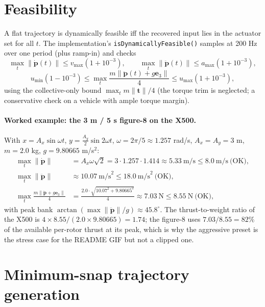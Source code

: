 \documentclass[11pt]{article}
\begin{document}
\section{Feasibility}
\label{sec:feas}

A flat trajectory is dynamically feasible iff the recovered input lies in the actuator set
for all $t$. The implementation's \texttt{isDynamicallyFeasible()} samples at 200 Hz over
one period (plus ramp-in) and checks
\begin{equation}
  \max_t \| \dot{\bm p}(t) \| \le v_{\max} (1 + 10^{-3}),
  \qquad
  \max_t \| \ddot{\bm p}(t) \| \le a_{\max} (1 + 10^{-3}),
  \label{eq:feas}
\end{equation}
\begin{equation}
  u_{\min}(1 - 10^{-3}) \le \max_t \frac{m \|\ddot{\bm p}(t) + g \bm e_3\|}{4}
  \le u_{\max}(1 + 10^{-3}),
  \label{eq:feas2}
\end{equation}
using the collective-only bound $\max_t m\|\bm t\|/4$ (the torque trim is neglected; a
conservative check on a vehicle with ample torque margin).

\paragraph{Worked example: the 3 m / 5 s figure-8 on the X500.} With
$x = A_x \sin \omega t$, $y = \frac{A_y}{2}\sin 2\omega t$, $\omega = 2\pi/5 \approx
1.257$ rad/s, $A_x = A_y = 3$ m, $m = 2.0$ kg, $g = 9.80665$ m/s$^2$:
\begin{align*}
  \max_t \|\dot{\bm p}\| &= A_x \omega \sqrt{2} = 3 \cdot 1.257 \cdot 1.414
    \approx 5.33\ \text{m/s} \le 8.0\ \text{m/s} \ \text{(OK)}, \\
  \max_t \|\ddot{\bm p}\| &\approx 10.07\ \text{m/s}^2 \le 18.0\ \text{m/s}^2
    \ \text{(OK)}, \\
  \max_t \frac{m \|\ddot{\bm p} + g \bm e_3\|}{4} &= \frac{2.0 \cdot \sqrt{10.07^2 +
    9.80665^2}}{4} \approx 7.03\ \text{N} \le 8.55\ \text{N} \ \text{(OK)},
\end{align*}
with peak bank $\arctan(\max\|\ddot{\bm p}\|/g) \approx 45.8^\circ$. The thrust-to-weight
ratio of the X500 is $4 \times 8.55 / (2.0 \times 9.80665) = 1.74$; the figure-8 uses
$7.03/8.55 = 82\%$ of the available per-rotor thrust at its peak, which is why the
aggressive preset is the stress case for the README GIF but not a clipped one.

\section{Minimum-snap trajectory generation}
\end{document}
